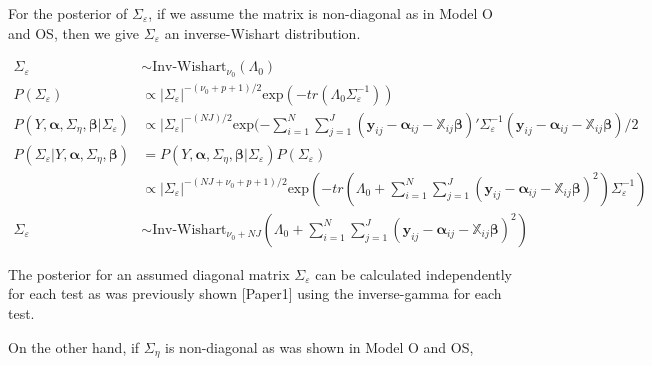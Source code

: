 \documentclass[
]{article}
\begin{document}
For the posterior of \(\Sigma_\varepsilon\), if we assume the matrix is non-diagonal as in Model O and OS, then we give \(\Sigma_\varepsilon\) an inverse-Wishart distribution.

\begin{equation*}
\begin{aligned}
\Sigma_\varepsilon &\sim \text{Inv-Wishart}_{\nu_0}(\Lambda_0)\\
P(\Sigma_\varepsilon) &\propto |\Sigma_\varepsilon|^{-(\nu_0+p+1)/2}\text{exp}(-tr(\Lambda_0\Sigma_\varepsilon^{-1}))\\
P(Y, \boldsymbol{\alpha}, \Sigma_\eta, \boldsymbol{\beta}|\Sigma_\varepsilon) &\propto |\Sigma_\varepsilon|^{-(NJ)/2}\text{exp}(-\sum^N_{i = 1}\sum^J_{j= 1} (\boldsymbol{y}_{ij} - \boldsymbol{\alpha}_{ij} - \boldsymbol{ \mathbb{X}}_{ij}\boldsymbol{\beta})'\Sigma_\varepsilon^{-1}(\boldsymbol{y}_{ij} - \boldsymbol{\alpha}_{ij} - \boldsymbol{ \mathbb{X}}_{ij}\boldsymbol{\beta})/2 \\
P(\Sigma_\varepsilon|Y, \boldsymbol{\alpha}, \Sigma_\eta, \boldsymbol{\beta}) & = P(Y, \boldsymbol{\alpha}, \Sigma_\eta, \boldsymbol{\beta}|\Sigma_\varepsilon)P(\Sigma_\varepsilon) \\ &\propto |\Sigma_\varepsilon|^{-(NJ +\nu_0+p+1)/2}\text{exp}(-tr(\Lambda_0 + \sum^N_{i = 1}\sum^J_{j= 1} (\boldsymbol{y}_{ij} - \boldsymbol{\alpha}_{ij} - \boldsymbol{ \mathbb{X}}_{ij}\boldsymbol{\beta})^2)\Sigma_\varepsilon^{-1})\\
\Sigma_\varepsilon & \sim \text{Inv-Wishart}_{\nu_0 + NJ}(\Lambda_0+\sum^N_{i = 1}\sum^J_{j= 1} (\boldsymbol{y}_{ij} - \boldsymbol{\alpha}_{ij} - \boldsymbol{ \mathbb{X}}_{ij}\boldsymbol{\beta})^2)
\end{aligned}
\end{equation*}

The posterior for an assumed diagonal matrix \(\Sigma_\varepsilon\) can be calculated independently for each test as was previously shown {[}Paper1{]} using the inverse-gamma for each test.

On the other hand, if \(\Sigma_\eta\) is non-diagonal as was shown in Model O and OS,
\end{document}

